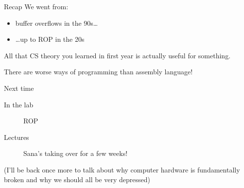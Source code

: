 \documentclass[9pt,aspectratio=169]{beamer}
\begin{document}
\begin{frame}[label={sec:org7221437}]{Recap}
We went from:
\begin{itemize}
\item buffer overflows in the 90s\ldots{}
\item \ldots{}up to ROP in the 20s
\end{itemize}

All that CS theory you learned in first year is actually useful for something.

There are worse ways of programming than assembly language!
\begin{block}{Next time}
\begin{description}
\item[{In the lab}] ROP
\item[{Lectures}] Sana's taking over for a few weeks!
\end{description}

(I'll be back once more to talk about why computer hardware is fundamentally broken and why we should all be very depressed)
\end{block}
\end{frame}
\end{document}
